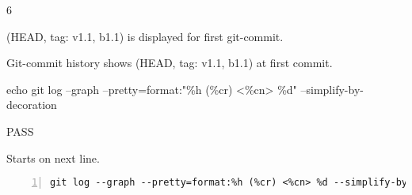 \begin{description}[align=right,leftmargin=3.2cm,labelindent=3.0cm]
\item[Step:] 6
\item[Confirm:] (HEAD, tag: v1.1, b1.1) is displayed for first git-commit.
\item[Expectation:] Git-commit history shows (HEAD, tag: v1.1, b1.1) at first commit.
\item[Command:] echo git  log --graph --pretty=format:"\%h (\%cr) <\%cn> \%d" --simplify-by-decoration
\item[Test Result:] PASS
\item[Evidence:] Starts on next line.
\end{description}
\begin{lstlisting}[numbers=left]
git log --graph --pretty=format:%h (%cr) <%cn> %d --simplify-by-decoration

\end{lstlisting}
